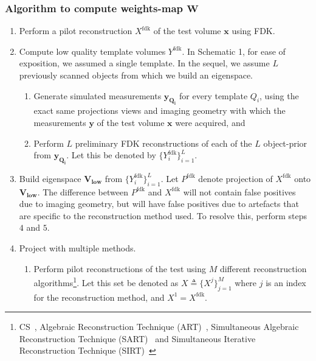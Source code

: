 \documentclass[journal]{IEEEtran}
\begin{document}
\subsubsection{\textbf{Algorithm to compute weights-map $\boldsymbol{W}$}}
\label{sec:thealgo}
\begin{enumerate}

\item Perform a pilot reconstruction $X^{\text{fdk}}$ of the
  test volume $\boldsymbol{x}$ using FDK.

\item Compute low quality template volumes $Y^\text{fdk}$. 
In Schematic 1, for ease of exposition, we assumed a single
template. In the sequel, we assume $L$ previously scanned objects from which we build
an eigenspace. 
\vspace{-0.1cm}

  \begin{enumerate}
  \item Generate simulated measurements $\boldsymbol{y_{Q_i}}$ for every template $Q_i$, using the exact same projections views and imaging geometry with which the measurements $\boldsymbol{y}$ of the test volume $\boldsymbol{x}$ were acquired, and 
\item Perform $L$  preliminary FDK reconstructions of each of the $L$ object-prior from $\boldsymbol{y_{Q_i}}$.  Let this be denoted by $\{Y^{\text{fdk}}_i\}_{i=1}^L$.
  \end{enumerate}
\item Build eigenspace $\boldsymbol{V_{\text{low}}}$ from $\{Y^{\text{fdk}}_i\}_{i=1}^L$.  Let $P^{\text{fdk}}$ denote projection of $X^{\text{fdk}}$ onto $\boldsymbol{V_{\text{low}}}$. The difference between $P^{\text{fdk}}$ and $X^{\text{fdk}}$ will not contain false positives due to imaging geometry, but will have false positives due to artefacts that are specific to the reconstruction method used. To resolve this, perform steps $4$ and $5$.
\item Project with multiple methods.
  \begin{enumerate}
  \item Perform pilot reconstructions of the test using $M$ different
    reconstruction algorithms\footnote{CS~\cite{lasso}, Algebraic Reconstruction Technique (ART)~\cite{art},
     Simultaneous Algebraic Reconstruction Technique (SART)~\cite{sart} and  Simultaneous Iterative Reconstruction Technique (SIRT)~\cite{sirt}}. Let this set be denoted
    as $X \triangleq \{X^j\}_{j=1}^M$ where $j$ is an index for the
    reconstruction method, and $X^1 = X^{\text{fdk}}$. 


\end{enumerate}
\end{enumerate}
\end{document}
